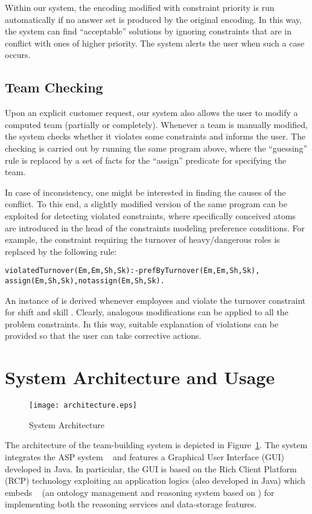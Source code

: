 \documentclass{tlp}
\begin{document}
Within our system, the encoding modified with constraint priority is run automatically
if no answer set is produced by the original encoding.
In this way, the system can find ``acceptable'' solutions
by ignoring constraints that are in conflict with ones of higher priority.
The system alerts the user when such a case occurs.


\subsection{Team Checking}
Upon an explicit customer request,
our system also allows the user to modify a computed team (partially or completely).
Whenever a team is manually modified,
the system checks whether it violates some constraints and informs the user.
The checking is carried out by running the same program above,
where the ``guessing'' rule is replaced by a set of facts for the ``assign''
predicate for specifying the team.

In case of inconsistency, one might be interested in finding the causes of the conflict.
To this end, a slightly modified version of the same program can be exploited for detecting violated constraints,
where specifically conceived atoms are introduced in the head of the constraints modeling preference conditions.
For example, the constraint requiring the turnover of heavy/dangerous roles is replaced by the
following rule:
\begin{alltt}\small
 violatedTurnover(Em,Em,Sh,Sk) :- prefByTurnover(Em,Em,Sh,Sk),
    assign(Em,Sh,Sk), not assign(Em,Sh,Sk).
\end{alltt}\normalsize
An instance of  is derived
whenever employees  and  violate the turnover constraint for shift  and skill .
Clearly, analogous modifications can be applied to all the problem constraints.
In this way, suitable explanation of violations can be provided so that
the user can take corrective actions.


\section{System Architecture and Usage}\label{sec:system}

\begin{figure}[t!]
\centering
\texttt{[image: architecture.eps]}
\caption{ System Architecture}\label{fig:arch}
\end{figure}


The architecture of the team-building system is depicted in Figure~\ref{fig:arch}.
The system integrates the ASP system \dlv~\cite{leon-etal-2002-dlv} and features
a Graphical User Interface (GUI) developed in Java.
In particular, the GUI is based on the Rich Client Platform (RCP) technology
exploiting an application logics (also developed in Java)
which embeds \ontodlv~\cite{ricc-etal-2008-jlc}
(an ontology management and reasoning system based on \dlv)
for implementing both the reasoning services and data-storage features.
\end{document}
